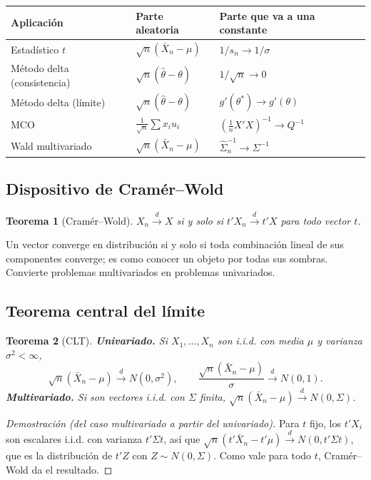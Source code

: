 \documentclass[11pt,a4paper]{article}
\theoremstyle{plain}
\newtheorem{teorema}{Teorema}[section]
\theoremstyle{definition}
\theoremstyle{remark}
\newcommand{\cd}{\xrightarrow{\;d\;}}
\begin{document}
\begin{center}
\begin{tabular}{@{}lll@{}}
\toprule
Aplicación & Parte aleatoria & Parte que va a una constante \\
\midrule
Estadístico $t$ & $\sqrt n(\bar X_n-\mu)$ & $1/s_n\to1/\sigma$ \\
Método delta (consistencia) & $\sqrt n(\hat\theta-\theta)$ & $1/\sqrt n\to0$ \\
Método delta (límite) & $\sqrt n(\hat\theta-\theta)$ & $g'(\theta^*)\to g'(\theta)$ \\
MCO & $\frac1{\sqrt n}\sum x_iu_i$ & $(\frac1nX'X)^{-1}\to Q^{-1}$ \\
Wald multivariado & $\sqrt n(\bar X_n-\mu)$ & $\hat\Sigma_n^{-1}\to\Sigma^{-1}$ \\
\bottomrule
\end{tabular}
\end{center}

\subsection{Dispositivo de Cramér--Wold}

\begin{teorema}[Cramér--Wold]\label{teo:cw}
$X_n\cd X$ si y solo si $t'X_n\cd t'X$ para todo vector $t$.
\end{teorema}

Un vector converge en distribución si y solo si toda combinación lineal de sus componentes
converge; es como conocer un objeto por todas sus sombras. Convierte problemas multivariados en
problemas univariados.

\subsection{Teorema central del límite}

\begin{teorema}[CLT]\label{teo:clt}
\textbf{Univariado.} Si $X_1,\dots,X_n$ son i.i.d. con media $\mu$ y varianza
$\sigma^2<\infty$,
\[
\sqrt n(\bar X_n-\mu)\cd N(0,\sigma^2),\qquad
\frac{\sqrt n(\bar X_n-\mu)}{\sigma}\cd N(0,1).
\]
\textbf{Multivariado.} Si son vectores i.i.d. con $\Sigma$ finita,
$\sqrt n(\bar X_n-\mu)\cd N(0,\Sigma)$.
\end{teorema}
\begin{proof}[Demostración (del caso multivariado a partir del univariado)]
Para $t$ fijo, los $t'X_i$ son escalares i.i.d. con varianza $t'\Sigma t$, así que
$\sqrt n(t'\bar X_n-t'\mu)\cd N(0,t'\Sigma t)$, que es la distribución de $t'Z$ con
$Z\sim N(0,\Sigma)$. Como vale para todo $t$, Cramér--Wold da el resultado.
\end{proof}
\end{document}
